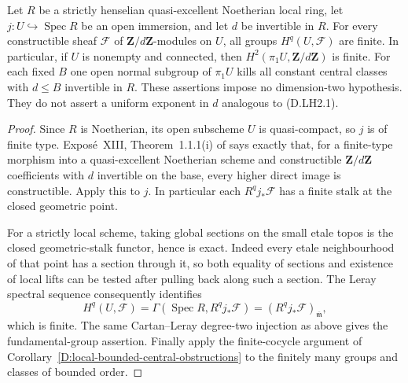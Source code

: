 \begin{corollary}
\label{D:strict-local-open-cohomology-finite}
Let $R$ be a strictly henselian quasi-excellent Noetherian local
ring, let $j:U\hookrightarrow\operatorname{Spec}R$ be an open
immersion, and let $d$ be invertible in $R$. For every constructible
sheaf $\mathcal F$ of $\mathbf Z/d\mathbf Z$-modules on $U$,
all groups $H^q(U,\mathcal F)$ are finite. In particular, if $U$
is nonempty and connected, then $H^2(\pi_1U,\mathbf Z/d\mathbf Z)$ is finite.
For each fixed $B$ one open normal subgroup of $\pi_1U$ kills
all constant central classes with $d\le B$ invertible in $R$.
These assertions impose no dimension-two hypothesis. They do
not assert a uniform exponent in $d$ analogous to (D.LH2.1).
\end{corollary}
\begin{proof}
Since $R$ is Noetherian, its open subscheme $U$ is quasi-compact,
so $j$ is of finite type. Expos\'e~XIII, Theorem~1.1.1(i) of
\citet{A_ILO2014} says exactly that, for a finite-type morphism
into a quasi-excellent Noetherian scheme and constructible
$\mathbf Z/d\mathbf Z$ coefficients with $d$ invertible on the
base, every higher direct image is constructible. Apply this
to $j$. In particular each $R^qj_*\mathcal F$ has a finite
stalk at the closed geometric point.

For a strictly local scheme, taking global sections on the
small etale topos is the closed geometric-stalk functor, hence
is exact. Indeed every etale neighbourhood of that point
has a section through it, so both equality of sections and
existence of local lifts can be tested after pulling back
along such a section. The Leray spectral sequence consequently
identifies
\[
 H^q(U,\mathcal F)
   =\Gamma(\operatorname{Spec}R,R^qj_*\mathcal F)
   =(R^qj_*\mathcal F)_{\overline{\mathfrak m}},
\]
which is finite. The same Cartan--Leray degree-two injection
as above gives the fundamental-group assertion. Finally apply
the finite-cocycle argument of
Corollary~\ref{D:local-bounded-central-obstructions} to the
finitely many groups and classes of bounded order.
\end{proof}
